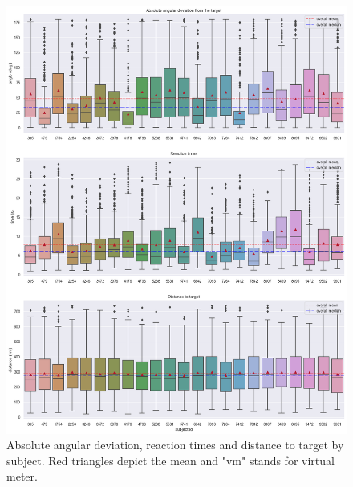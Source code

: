 \begin{figure}[!htb]
	\centering
	\includegraphics[width=160mm]{figures/ard_by_subject_23.png}
	\caption[Box plot by subject]{Absolute angular deviation, reaction times and distance to target by subject. Red triangles depict the mean and "vm" stands for virtual meter.}
	\label{fig:ard_by_subject_23}
\end{figure}


